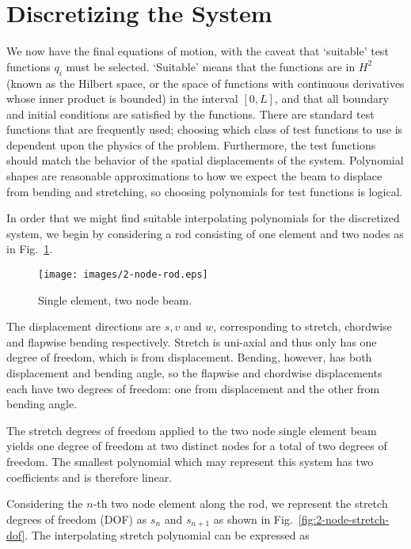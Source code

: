 \section{Discretizing the System}
\label{sec:discretizing}
We now have the final equations of motion, with the caveat that `suitable' test functions $q_i$ must be selected. `Suitable' means that the functions are in $H^2$ (known as the Hilbert space, or the space of functions with continuous derivatives whose inner product is bounded) in the interval $[0,L]$, and that all boundary and initial conditions are satisfied by the functions. There are standard test functions that are frequently used; choosing which class of test functions to use is dependent upon the physics of the problem. Furthermore, the test functions should match the behavior of the spatial displacements of the system. Polynomial shapes are reasonable approximations to how we expect the beam to displace from bending and stretching, so choosing polynomials for test functions is logical.

In order that we might find suitable interpolating polynomials for the discretized system, we begin by considering a rod consisting of one element and two nodes as in Fig.~\ref{fig:sing_el_2node}.

\begin{figure}[ht!]
\label{fig:sing_el_2node}
\caption{Single element, two node beam.}
\centering
\texttt{[image: images/2-node-rod.eps]}
\end{figure}

The displacement directions are $s,v$ and $w$, corresponding to stretch, chordwise and flapwise bending respectively. Stretch is uni-axial and thus only has one degree of freedom, which is from displacement. Bending, however, has both displacement and bending angle, so the flapwise and chordwise displacements each have two degrees of freedom: one from displacement and the other from bending angle.

The stretch degrees of freedom applied to the two node single element beam yields one degree of freedom at two distinct nodes for a total of two degrees of freedom. The smallest polynomial which may represent this system has two coefficients and is therefore linear.

Considering the $n$-th two node element along the rod, we represent the stretch degrees of freedom (DOF) as $s_n$ and $s_{n+1}$ as shown in Fig.~\ref{fig:2-node-stretch-dof}. The interpolating stretch polynomial can be expressed as 

